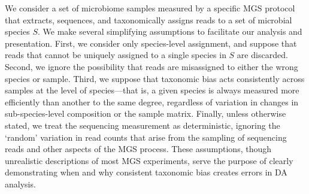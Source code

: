 \documentclass[
]{article}
\begin{document}
We consider a set of microbiome samples measured by a specific MGS protocol that extracts, sequences, and taxonomically assigns reads to a set of microbial species \(S\).
We make several simplifying assumptions to facilitate our analysis and presentation.
First, we consider only species-level assignment, and suppose that reads that cannot be uniquely assigned to a single species in \(S\) are discarded.
Second, we ignore the possibility that reads are misassigned to either the wrong species or sample.
Third, we suppose that taxonomic bias acts consistently across samples at the level of species---that is, a given species is always measured more efficiently than another to the same degree, regardless of variation in changes in sub-species-level composition or the sample matrix.
Finally, unless otherwise stated, we treat the sequencing measurement as deterministic, ignoring the `random' variation in read counts that arise from the sampling of sequencing reads and other aspects of the MGS process.
These assumptions, though unrealistic descriptions of most MGS experiments, serve the purpose of clearly demonstrating when and why consistent taxonomic bias creates errors in DA analysis.
\end{document}
